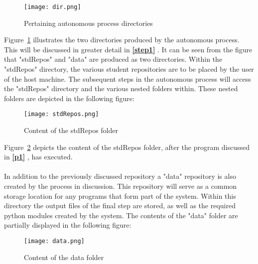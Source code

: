 \begin{figure}[H]
\begin{center}
\texttt{[image: dir.png]}
\caption{Pertaining autonomous process directories}
\label{dir}
\end{center}
\end{figure}

Figure~\ref{dir} illustrates the two directories produced by the autonomous process. This will be discussed in greater detail in \textbf{\ref{step1} }. It can be seen from the figure that "stdRepos" and "data" are produced as two directories. Within the "stdRepos" directory, the various student repositories are to be placed by the user of the host machine. The subsequent steps in the autonomous process will access the "stdRepos" directory and the various nested folders within. These nested folders are depicted in the following figure:

\begin{figure}[H]
\begin{center}
\texttt{[image: stdRepos.png]}
\caption{Content of the stdRepos folder}
\label{stdRepos}
\end{center}
\end{figure}

Figure~\ref{stdRepos} depicts the content of the stdRepos folder, after the program discussed in \textbf{\ref{p1} }, has executed.
\\\\
In addition to the previously discussed repository a "data" repository is also created by the process in discussion. This repository will serve as a common storage location for any programs that form part of the system. Within this directory the output files of the final step are stored, as well as the required python modules created by the system. The contents of the "data" folder are partially displayed in the following figure:

\begin{figure}[H]
\begin{center}
\texttt{[image: data.png]} 
\caption{Content of the data folder}
\label{data}
\end{center}
\end{figure}

